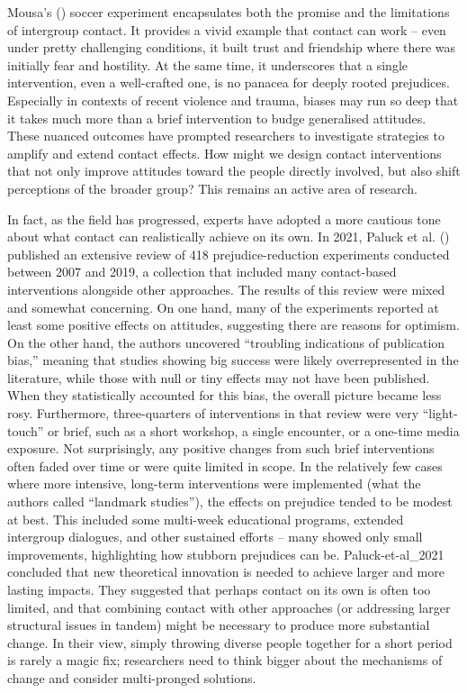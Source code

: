 \documentclass[
  letterpaper,
]{book}
\begin{document}
Mousa's () soccer experiment
encapsulates both the promise and the limitations of intergroup contact.
It provides a vivid example that contact can work -- even under pretty
challenging conditions, it built trust and friendship where there was
initially fear and hostility. At the same time, it underscores that a
single intervention, even a well-crafted one, is no panacea for deeply
rooted prejudices. Especially in contexts of recent violence and trauma,
biases may run so deep that it takes much more than a brief intervention
to budge generalised attitudes. These nuanced outcomes have prompted
researchers to investigate strategies to amplify and extend contact
effects. How might we design contact interventions that not only improve
attitudes toward the people directly involved, but also shift
perceptions of the broader group? This remains an active area of
research.

In fact, as the field has progressed, experts have adopted a more
cautious tone about what contact can realistically achieve on its own.
In 2021, Paluck et al. ()
published an extensive review of 418 prejudice-reduction experiments
conducted between 2007 and 2019, a collection that included many
contact-based interventions alongside other approaches. The results of
this review were mixed and somewhat concerning. On one hand, many of the
experiments reported at least some positive effects on attitudes,
suggesting there are reasons for optimism. On the other hand, the
authors uncovered ``troubling indications of publication bias,'' meaning
that studies showing big success were likely overrepresented in the
literature, while those with null or tiny effects may not have been
published. When they statistically accounted for this bias, the overall
picture became less rosy. Furthermore, three-quarters of interventions
in that review were very ``light-touch'' or brief, such as a short
workshop, a single encounter, or a one-time media exposure. Not
surprisingly, any positive changes from such brief interventions often
faded over time or were quite limited in scope. In the relatively few
cases where more intensive, long-term interventions were implemented
(what the authors called ``landmark studies''), the effects on prejudice
tended to be modest at best. This included some multi-week educational
programs, extended intergroup dialogues, and other sustained efforts --
many showed only small improvements, highlighting how stubborn
prejudices can be. Paluck-et-al\_2021 concluded that new theoretical
innovation is needed to achieve larger and more lasting impacts. They
suggested that perhaps contact on its own is often too limited, and that
combining contact with other approaches (or addressing larger structural
issues in tandem) might be necessary to produce more substantial change.
In their view, simply throwing diverse people together for a short
period is rarely a magic fix; researchers need to think bigger about the
mechanisms of change and consider multi-pronged solutions.
\end{document}
